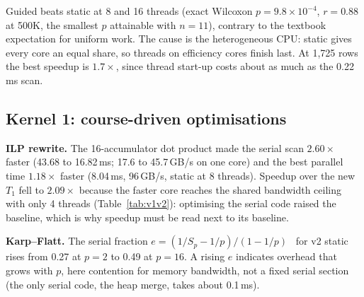 \documentclass[conference,a4paper]{IEEEtran}
\begin{document}
Guided beats static at 8 and 16 threads (exact Wilcoxon $p=9.8\times10^{-4}$, $r=0.88$ at 500K, the smallest $p$
attainable with $n=11$), contrary to the textbook expectation for uniform work. The cause is the heterogeneous CPU:
static gives every core an equal share, so threads on efficiency cores finish last. At 1,725 rows the best speedup
is $1.7\times$, since thread start-up costs about as much as the 0.22\,ms scan.

\subsection{Kernel 1: course-driven optimisations}
\textbf{ILP rewrite.} The 16-accumulator dot product made the serial scan $2.60\times$ faster (43.68 to 16.82\,ms;
17.6 to 45.7\,GB/s on one core) and the best parallel time $1.18\times$ faster (8.04\,ms, 96\,GB/s, static at 8
threads). Speedup over the new $T_1$ fell to $2.09\times$ because the faster core reaches the shared bandwidth ceiling
with only 4 threads (Table~\ref{tab:v1v2}): optimising the serial code raised the baseline, which is why speedup must be
read next to its baseline.

\begin{table}[!t]
\caption{Kernel 1, v1 to v2, at $N=500{,}000$ (medians of 11 runs)}
\label{tab:v1v2}
\centering\footnotesize
{}
\end{table}

\textbf{Karp--Flatt.} The serial fraction $e=(1/S_p-1/p)/(1-1/p)$~\cite{karpflatt} for v2 static rises from 0.27 at
$p=2$ to 0.49 at $p=16$. A rising $e$ indicates overhead that grows with $p$, here contention for memory bandwidth,
not a fixed serial section (the only serial code, the heap merge, takes about 0.1\,ms).
\end{document}
